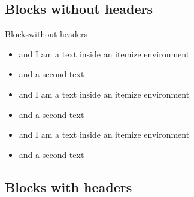 \documentclass[]{beamer}
\begin{document}
\begin{frame}{\secname{}}
\end{frame}

\subsection{Blocks without headers}

\begin{frame}{Blocks}{without headers}
\begin{block}{}
\begin{itemize}
\item and I am a text inside an itemize environment
\item and a second text
\end{itemize}
\end{block}

\vfill

\begin{exampleblock}{}
\begin{itemize}
\item and I am a text inside an itemize environment
\item and a second text
\end{itemize}
\end{exampleblock}

\vfill

\begin{alertblock}{}
\begin{itemize}
\item and I am a text inside an itemize environment
\item and a second text
\end{itemize}
\end{alertblock}
\end{frame}


\subsection{Blocks with headers}
\end{document}
